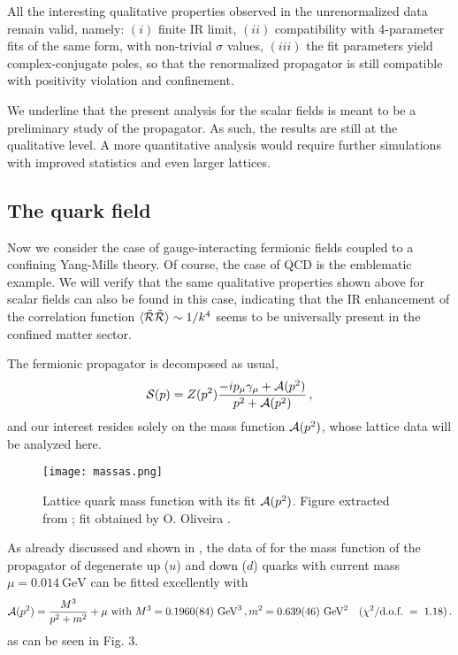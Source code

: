 All the interesting qualitative properties observed in the unrenormalized data remain valid, namely: $(i)$ finite IR limit, $(ii)$ compatibility with 4-parameter fits of the same form, with non-trivial $\sigma$ values, $(iii)$ the fit parameters yield complex-conjugate poles, so that the renormalized propagator is still compatible with positivity violation and confinement.

We underline that the present analysis for the scalar fields is meant to be a preliminary study
of the propagator. As such, the results are still at the qualitative level. A more quantitative
analysis would require further simulations with improved statistics and even larger lattices.


\subsection{The quark field}
\label{quarks}

Now we consider the case of gauge-interacting fermionic fields coupled to a confining Yang-Mills theory. Of course, the case of QCD is the emblematic example. 
We will verify that the same qualitative properties shown above for scalar fields can also be found in this case, indicating that the IR enhancement of the correlation function $\langle\tilde {\cal R}\tilde {\cal R}\rangle\sim 1/k^4$ seems to be universally present in the confined matter sector.

The fermionic propagator is decomposed as usual,
\begin{eqnarray}
{\cal S}(p)=Z(p^2)\frac{-ip_{\mu}\gamma_{\mu}+{\cal A}(p^2)}{p^2+{\cal A}(p^2)}\,,
\end{eqnarray}
and our interest resides solely on the mass function ${\cal A}(p^2)$, whose lattice data will be analyzed here.


\begin{figure}[h!]
   \centering
       \texttt{[image: massas.png]}
               \caption{Lattice quark mass function \cite{Parappilly:2005ei} with its fit ${\cal A}(p^2)$. Figure extracted from \cite{Dudal:2013vha}; fit obtained by O. Oliveira \cite{Orlando}.}
\end{figure}


As already discussed and shown in \cite{Dudal:2013vha}, the data of \cite{Parappilly:2005ei} for the mass function of the propagator of degenerate up ($u$) and down ($d$) quarks with current mass $\mu=0.014~\text{GeV}$ can be fitted excellently with
\begin{equation}\label{fit}
{\cal A}(p^2)=\frac{M^3}{p^2+m^2}+\mu~\text{with}~M^3=0.1960(84)~\text{GeV}^3\,, m^2=0.639(46)~\text{GeV}^2 \quad (\chi^2/\text{d.o.f.}~=~1.18)\,.
\end{equation}
as can be seen in Fig. 3.
 
